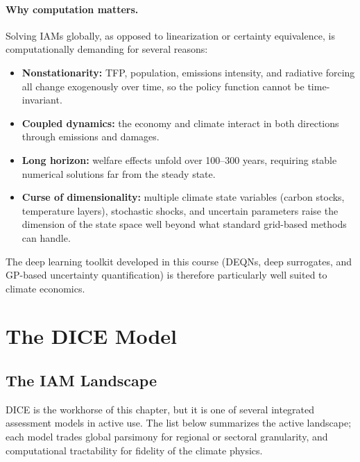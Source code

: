 \documentclass[11pt,a4paper]{report}
\begin{document}
\paragraph{Why computation matters.}
Solving IAMs globally, as opposed to linearization or certainty equivalence, is computationally demanding for several reasons:
\begin{itemize}[itemsep=2pt]
\item \textbf{Nonstationarity:} TFP, population, emissions intensity, and radiative forcing all change exogenously over time, so the policy function cannot be time-invariant.
\item \textbf{Coupled dynamics:} the economy and climate interact in both directions through emissions and damages.
\item \textbf{Long horizon:} welfare effects unfold over 100--300 years, requiring stable numerical solutions far from the steady state.
\item \textbf{Curse of dimensionality:} multiple climate state variables (carbon stocks, temperature layers), stochastic shocks, and uncertain parameters raise the dimension of the state space well beyond what standard grid-based methods can handle.
\end{itemize}
The deep learning toolkit developed in this course (DEQNs, deep surrogates, and GP-based uncertainty quantification) is therefore particularly well suited to climate economics.

\section{The DICE Model}
\label{sec:dice}

\subsection{The IAM Landscape}
\label{sec:iam_landscape}

DICE is the workhorse of this chapter, but it is one of several integrated assessment models in active use.  The list below summarizes the active landscape; each model trades global parsimony for regional or sectoral granularity, and computational tractability for fidelity of the climate physics.
\end{document}
